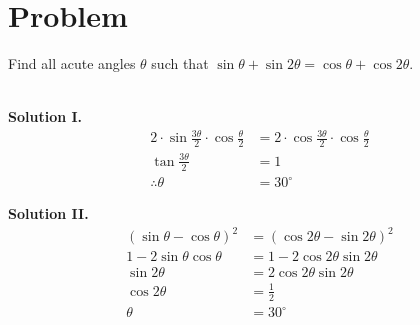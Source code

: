 \documentclass{article}
\begin{document}
\section*{Problem}
Find all acute angles $\theta$ such that $\sin \theta + \sin 2\theta = \cos \theta + \cos 2\theta$.
\\\\
\begin{minipage}[t]{0.5\textwidth}
\textbf{Solution I.}
\begin{align*}
    2 \cdot \sin \frac{3\theta}{2} \cdot \cos \frac{\theta}{2} &= 2 \cdot \cos \frac{3\theta}{2} \cdot \cos \frac{\theta}{2} \\
    \tan \frac{3\theta}{2} &= 1 \\
    \therefore \theta &= \boxed{30^\circ}
\end{align*}
\end{minipage}
\begin{minipage}[t]{0.5\textwidth}
\textbf{Solution II.}
\begin{align*}
    (\sin\theta - \cos\theta)^2 &= (\cos2\theta - \sin2\theta)^2 \\
    1 - 2\sin\theta\cos\theta &= 1 - 2\cos2\theta\sin2\theta \\
    \sin2\theta &= 2\cos2\theta\sin2\theta \\
    \cos2\theta &= \frac{1}{2} \\
    \theta &= \boxed{30^\circ}
\end{align*}
\end{minipage}

\newpage
\end{document}

